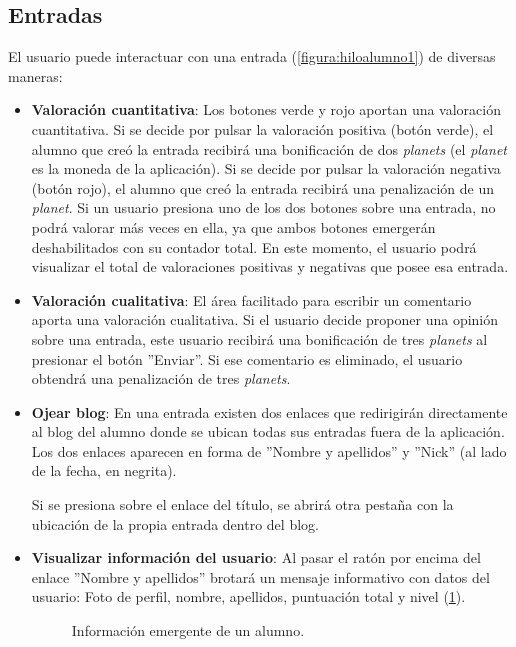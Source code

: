 \documentclass[a4paper, 12pt]{book}
\begin{document}
\subsection{Entradas}
El usuario puede interactuar con una entrada (\ref{figura:hiloalumno1}) de diversas maneras:
\begin{itemize}
  \item {\bfseries Valoraci\'on cuantitativa}: Los botones verde y rojo aportan una valoraci\'on cuantitativa. Si se decide por pulsar 
  la valoraci\'on positiva (bot\'on verde), el alumno que cre\'o la entrada recibir\'a una bonificaci\'on de dos \textit{planets} (el \textit{planet} es la 
  moneda de la aplicaci\'on). Si se decide por pulsar la valoraci\'on negativa (bot\'on rojo), el alumno que cre\'o la entrada recibir\'a una penalizaci\'on 
  de un \textit{planet}. Si un usuario presiona uno de los dos botones sobre una entrada, no podr\'a valorar m\'as veces en ella, ya que ambos botones 
  emerger\'an deshabilitados con su contador total. En este momento, el usuario podr\'a visualizar el total de valoraciones positivas y negativas que posee 
  esa entrada.
  \item {\bfseries Valoraci\'on cualitativa}: El \'area facilitado para escribir un comentario aporta una valoraci\'on cualitativa. Si el usuario decide 
  proponer una opini\'on sobre una entrada, este usuario recibir\'a una bonificaci\'on de tres \textit{planets} al presionar el bot\'on ''Enviar''. Si ese
  comentario es eliminado, el usuario obtendr\'a una penalizaci\'on de tres \textit{planets}.
  \item {\bfseries Ojear blog}: En una entrada existen dos enlaces que redirigir\'an directamente al blog del alumno donde se ubican todas sus entradas 
  fuera de la aplicaci\'on. Los dos enlaces aparecen en forma de ''Nombre y apellidos'' y ''Nick'' (al lado de la fecha, en negrita).
  
  Si se presiona sobre el enlace del t\'itulo, se abrir\'a otra pesta\~na con la ubicaci\'on de la propia entrada dentro del blog.
  \item {\bfseries Visualizar informaci\'on del usuario}: Al pasar el rat\'on por encima del enlace ''Nombre y apellidos'' brotar\'a un mensaje informativo 
  con datos del usuario: Foto de perfil, nombre, apellidos, puntuaci\'on total y nivel (\ref{figura:hiloalumno2}).
  \begin{figure}[htbp] 
    \centering
    \caption{Informaci\'on emergente de un alumno.}
    \label{figura:hiloalumno2}
  \end{figure}
  

\end{itemize}
\end{document}
